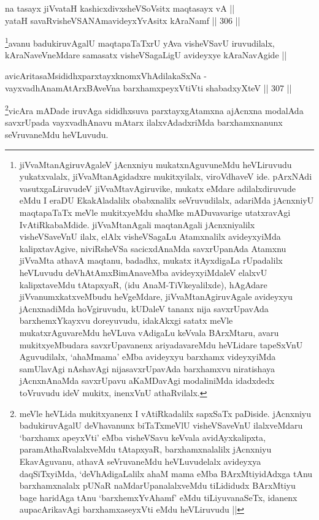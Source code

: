 \begin{shl}
na tasayx jiVvataH kashicxdivxsheVSoV\s sitx maqtasayx vA || \\
yataH savaRvisheVSANAmavideyxYvAsitx kAraNamf ||  306 ||  
\end{shl}

\begin{artha}
\footnote{jiVvaMtanAgiruvAgaleV jAcnxniyu mukatxnAguvuneMdu
  heVLiruvudu yukatxvalalx, jiVvaMtanAgidadxre mukitxyilalx,
  viroVdhaveV ide. pArxNAdi vasutxgaLiruvudeV jiVvaMtavAgiruvike,
  mukatx eMdare adilalxdiruvude eMdu I eraDU EkakAladalilx obabxnalilx
  seVruvudilalx, adariMda jAcnxniyU maqtapaTaTx meVle mukitxyeMdu
  shaMke mADuvavarige utatxravAgi IvAtiRkabaMdide. jiVvaMtanAgali
  maqtanAgali jAcnxniyalilx visheVSaveVnU ilalx, elAlx visheVSagaLu
  Atamxnalilx avideyxyiMda kalipxtavAgive, niviRsheVSa sacicxdAnaMda
  savxrUpanAda Atamxnu jiVvaMta athavA maqtanu, badadhx, mukatx
  itAyxdigaLa rUpadalilx heVLuvudu deVhAtAmxBimAnaveMba
  avideyxyiMdaleV elalxvU kalipxtaveMdu tAtapxyaR, (idu
  AnaM-TiVkeyalilxde), hAgAdare jiVvanumxkatxveMbudu heVgeMdare,
  jiVvaMtanAgiruvAgale avideyxyu jAcnxnadiMda hoVgiruvudu, kUDaleV
  tananx nija savxrUpavAda barxhemxYkayxvu doreyuvudu, idakAkxgi
  satatx meVle mukatxrAguvareMdu heVLuva vAdigaLu keVvala BArxMtaru,
  avaru mukitxyeMbudara savxrUpavanenx ariyadavareMdu heVLidare
  tapeSxVnU Aguvudilalx, `ahaMmama' eMba avideyxyu barxhamx
  videyxyiMda samUlavAgi nAshavAgi nijasavxrUpavAda barxhamxvu
  niratishaya jAcnxnAnaMda savxrUpavu aKaMDavAgi modaliniMda idadxdedx
  toVruvudu ideV mukitx, inenxVnU athaRvilalx.}avanu badukiruvAgalU maqtapaTaTxrU yAva visheVSavU
iruvudilalx, kAraNaveVneMdare samasatx visheVSagaLigU avideyxye
kAraNavAgide ||
\end{artha}

\begin{shl}
avicAritasaMsididhxparxtayxknomxVhAdilakaSxNa - \\
vayxvadhAnamAtArxBAveVna barxhamxpeyxVtiVti shabadxyXteV ||  307 ||  
\end{shl}

\begin{artha}
\footnote{meVle heVLida mukitxyanenx I vAtiRkadalilx sapxSaTx
  paDiside. jAcnxniyu badukiruvAgalU deVhavanunx biTaTxmeVlU
  visheVSaveVnU ilalxveMdaru `barxhamx apeyxVti' eMba visheVSavu
  keVvala avidAyxkalipxta, paramAthaRvalalxveMdu tAtapxyaR,
  barxhamxnalalilx jAcnxniyu EkavAguvanu, athavA seVruvaneMdu
  heVLuvudelalx avideyxya daqSiTxyiMda, `deVhAdigaLalilx ahaM mama
  eMba BArxMtiyidAdxga tAnu barxhamxnalalx pUNaR naMdarUpanalalxveMdu
  tiLididudx BArxMtiyu bage haridAga tAnu `barxhemxYvAhamf' eMdu
  tiLiyuvanaSeTx, idanenx aupacArikavAgi barxhamxaseyxVti eMdu
  heVLiruvudu ||}vicAra mADade iruvAga sididhxsuva parxtayxgAtamxna ajAcnxna
modalAda savxrUpada vayxvadhAnavu mAtarx ilalxvAdadxriMda
barxhamxnanunx seVruvaneMdu heVLuvudu.
\end{artha}

